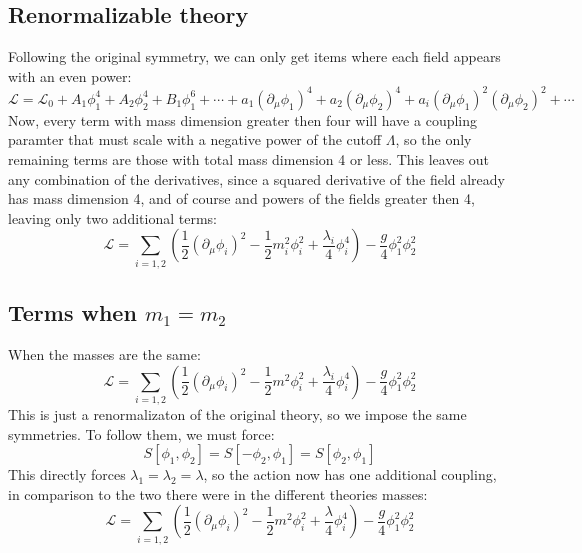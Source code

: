 \documentclass{article}
\begin{document}
\subsection{Renormalizable theory}
Following the original symmetry, we can only get items where each field appears with an even power:
\begin{equation}
    \mathcal{L} = \mathcal{L}_0 + A_1\phi_1^4 + A_2\phi_2^4 + B_1\phi_1^6 + \cdots + a_1 \left(\partial_\mu \phi_1\right)^4 + a_2 \left(\partial_\mu \phi_2\right)^4 + a_i \left(\partial_\mu \phi_1\right)^2 \left(\partial_\mu \phi_2\right)^2 + \cdots
\end{equation}
Now, every term with mass dimension greater then four will have a coupling paramter that must scale with a negative power of the cutoff $\Lambda$, so the only remaining terms are those with total mass dimension 4 or less. This leaves out any combination of the derivatives, since a squared derivative of the field already has mass dimension 4, and of course and powers of the fields greater then 4, leaving only two additional terms:
\begin{equation}
    \mathcal{L} = \sum_{i=1,2}\left(
        \frac{1}{2}\left(\partial_\mu\phi_i\right)^2 - \frac{1}{2}m_i^2\phi_i^2
        + \frac{\lambda_i}{4}\phi_i^4
    \right) - \frac{g}{4}\phi_1^2\phi_2^2
\end{equation}
\subsection{Terms when $m_1 = m_2$}
When the masses are the same:
\begin{equation}
    \mathcal{L} = \sum_{i=1,2}\left(
        \frac{1}{2}\left(\partial_\mu\phi_i\right)^2 - \frac{1}{2}m^2\phi_i^2
        + \frac{\lambda_i}{4}\phi_i^4
    \right) - \frac{g}{4}\phi_1^2\phi_2^2
\end{equation}
This is just a renormalizaton of the original theory, so we impose the same symmetries. To follow them, we must force:
\begin{equation}
    S[\phi_1, \phi_2] = S[-\phi_2, \phi_1] = S[\phi_2, \phi_1]
\end{equation}
This directly forces $\lambda_1 = \lambda_2 = \lambda$, so the action now has one additional coupling, in comparison to the two there were in the different theories masses:
\begin{equation}
    \mathcal{L} = \sum_{i=1,2}\left(
        \frac{1}{2}\left(\partial_\mu\phi_i\right)^2 - \frac{1}{2}m^2\phi_i^2
        + \frac{\lambda}{4}\phi_i^4
    \right) - \frac{g}{4}\phi_1^2\phi_2^2
\end{equation}
\end{document}
